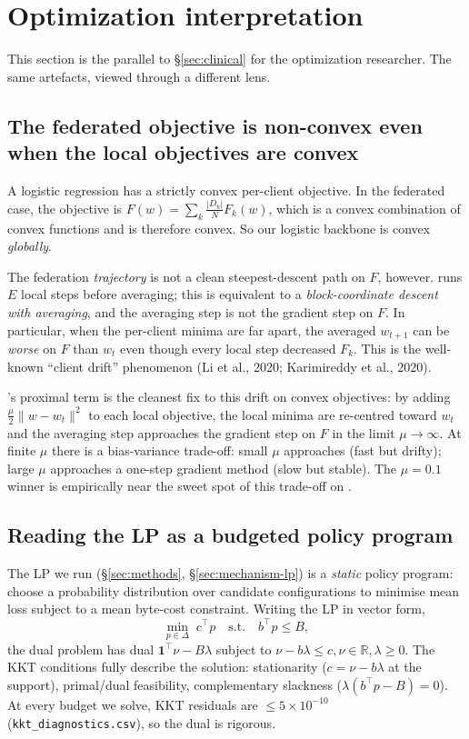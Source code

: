 \section{Optimization interpretation}
\label{sec:optimization}

This section is the parallel to \S\ref{sec:clinical} for the optimization
researcher. The same artefacts, viewed through a different lens.

\subsection{The federated objective is non-convex even when the local objectives are convex}
A logistic regression has a strictly convex per-client objective. In the
federated case, the objective is $F(w) = \sum_k \frac{|D_k|}{N} F_k(w)$, which
is a convex combination of convex functions and is therefore convex. So our
logistic backbone is convex \emph{globally}.

The federation \emph{trajectory} is not a clean steepest-descent path on
$F$, however. \fedavg{} runs $E$ local steps before averaging; this is
equivalent to a \emph{block-coordinate descent with averaging}, and the
averaging step is not the gradient step on $F$. In particular, when the per-client
minima are far apart, the averaged $w_{t+1}$ can be \emph{worse} on $F$ than
$w_t$ even though every local step decreased $F_k$. This is the well-known
``client drift'' phenomenon (Li et al., 2020; Karimireddy et al., 2020).

\fedprox{}'s proximal term is the cleanest fix to this drift on convex
objectives: by adding $\frac{\mu}{2}\|w - w_t\|^2$ to each local objective, the
local minima are re-centred toward $w_t$ and the averaging step approaches the
gradient step on $F$ in the limit $\mu \to \infty$. At finite $\mu$ there is a
bias-variance trade-off: small $\mu$ approaches \fedavg{} (fast but drifty);
large $\mu$ approaches a one-step gradient method (slow but stable). The
$\mu \!=\! 0.1$ winner is empirically near the sweet spot of this trade-off
on \mimic{}.

\subsection{Reading the LP as a budgeted policy program}
The LP we run (\S\ref{sec:methods}, \S\ref{sec:mechanism-lp}) is a
\emph{static} policy program: choose a probability distribution over candidate
configurations to minimise mean loss subject to a mean byte-cost constraint.
Writing the LP in vector form,
\[
\min_{p\in\Delta} \;c^\top p \quad \text{s.t.} \quad b^\top p \leq B,
\]
the dual problem has dual $\mathbf{1}^\top \nu - B\lambda$ subject to
$\nu - b\lambda \leq c, \nu \in \mathbb{R}, \lambda \geq 0$. The KKT conditions
fully describe the solution: stationarity ($c \!=\! \nu - b\lambda$ at the
support), primal/dual feasibility, complementary slackness ($\lambda(b^\top p
- B) = 0$). At every budget we solve, KKT residuals are $\leq 5\!\times\!10^{-10}$
(\texttt{kkt\_diagnostics.csv}), so the dual is rigorous.

